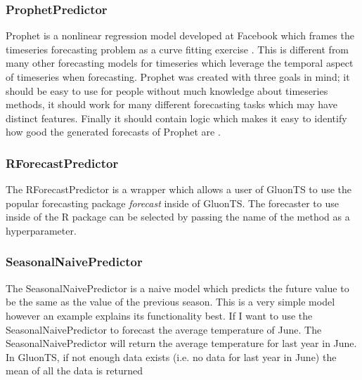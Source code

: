 \subsubsection{ProphetPredictor}
Prophet is a nonlinear regression model developed at Facebook which frames the timeseries forecasting problem as a curve fitting exercise \cite{hyndman_forecasting_3rd}. This is different from many other forecasting models for timeseries which leverage the temporal aspect of timeseries when forecasting. Prophet was created with three goals in mind; it should be easy to use for people without  much knowledge about timeseries methods, it should work for many different forecasting tasks which may have distinct features. Finally it should contain logic which makes it easy to identify how good the generated forecasts of Prophet are \cite{taylor_forecasting_2017}. 

\subsubsection{RForecastPredictor}
The RForecastPredictor is a wrapper which allows a user of GluonTS to use the popular forecasting package \textit{forecast} inside of GluonTS.  The forecaster to use inside of the R package can be selected by passing the name of the method as a hyperparameter\cite{gluonts-website,r-forecast-package}.

\subsubsection{SeasonalNaivePredictor}
The SeasonalNaivePredictor is a naive model which predicts the future value to be the same as the value of the previous season. This is a very simple model however an example explains its functionality best. If I want to use the SeasonalNaivePredictor to forecast the average temperature of June. The SeasonalNaivePredictor will return the average temperature for last year in June. In GluonTS, if not enough data exists (i.e. no data for last year in June) the mean of all the data is returned\cite{gluonts-website,hyndman_forecasting_3rd}

